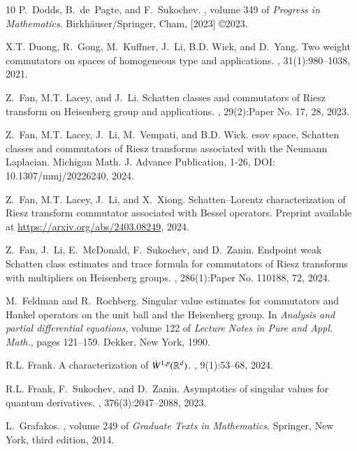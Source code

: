 \documentclass[12pt]{amsart}
\begin{document}
\begin{thebibliography}{10}
P.~Dodds, B.~de~Pagte, and F.~Sukochev.
, volume 349 of
  {\em Progress in Mathematics}.
\newblock Birkh\"{a}user/Springer, Cham, [2023] \copyright 2023.

X.T. Duong, R.~Gong, M.~Kuffner, J.~Li, B.D. Wick, and D.~Yang.
\newblock Two weight commutators on spaces of homogeneous type and
  applications.
, 31(1):980--1038, 2021.

Z.~Fan, M.T. Lacey, and J.~Li.
\newblock Schatten classes and commutators of {R}iesz transform on {H}eisenberg
  group and applications.
, 29(2):Paper No. 17, 28, 2023.

Z.~Fan, M.T. Lacey, J.~Li, M.~Vempati, and B.D. Wick.
esov space, {S}chatten classes and commutators of {R}iesz
  transforms associated with the {N}eumann {L}aplacian.
\newblock Michigan Math. J. Advance Publication, 1-26, DOI:
  10.1307/mmj/20226240, 2024.

Z.~Fan, M.T. Lacey, J.~Li, and X.~Xiong.
\newblock Schatten--{L}orentz characterization of {R}iesz transform commutator
  associated with {B}essel operators.
\newblock Preprint available at \url{https://arxiv.org/abs/2403.08249}, 2024.

Z.~Fan, J.~Li, E.~McDonald, F.~Sukochev, and D.~Zanin.
\newblock Endpoint weak {S}chatten class estimates and trace formula for
  commutators of {R}iesz transforms with multipliers on {H}eisenberg groups.
, 286(1):Paper No. 110188, 72, 2024.

M.~Feldman and R.~Rochberg.
\newblock Singular value estimates for commutators and {H}ankel operators on
  the unit ball and the {H}eisenberg group.
\newblock In {\em Analysis and partial differential equations}, volume 122 of
  {\em Lecture Notes in Pure and Appl. Math.}, pages 121--159. Dekker, New
  York, 1990.

R.L. Frank.
\newblock A characterization of {$\dot W{}^{1,p}(\Bbb R^d)$}.
, 9(1):53--68, 2024.

R.L. Frank, F.~Sukochev, and D.~Zanin.
\newblock Asymptotics of singular values for quantum derivatives.
, 376(3):2047--2088, 2023.

L.~Grafakos.
, volume 249 of {\em Graduate Texts
  in Mathematics}.
\newblock Springer, New York, third edition, 2014.


\end{thebibliography}
\end{document}
